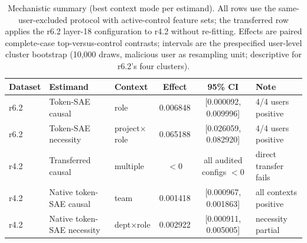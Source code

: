 \begin{table}[htbp]
\caption{Mechanistic summary (best context mode per estimand). All rows use the same-user-excluded protocol with active-control feature sets; the transferred row applies the r6.2 layer-18 configuration to r4.2 without re-fitting. Effects are paired complete-case top-versus-control contrasts; intervals are the prespecified user-level cluster bootstrap (10,000 draws, malicious user as resampling unit; descriptive for r6.2's four clusters).}
\label{tab:cert_mechanistic}
\centering
\small
\setlength{\tabcolsep}{5pt}
\begin{tabular}{lllccl}
\toprule
Dataset & Estimand & Context & Effect & 95\% CI & Note \\
\midrule
r6.2 & Token-SAE causal & role & 0.006848 & [0.000092, 0.009996] & 4/4 users positive \\
r6.2 & Token-SAE necessity & project$\times$role & 0.065188 & [0.026059, 0.082920] & 4/4 users positive \\
\midrule
r4.2 & Transferred causal & multiple & $<0$ & all audited configs $<0$ & direct transfer fails \\
r4.2 & Native token-SAE causal & team & 0.001418 & [0.000967, 0.001863] & all contexts positive \\
r4.2 & Native token-SAE necessity & dept$\times$role & 0.002922 & [0.000911, 0.005005] & necessity partial \\
\bottomrule
\end{tabular}
\end{table}
